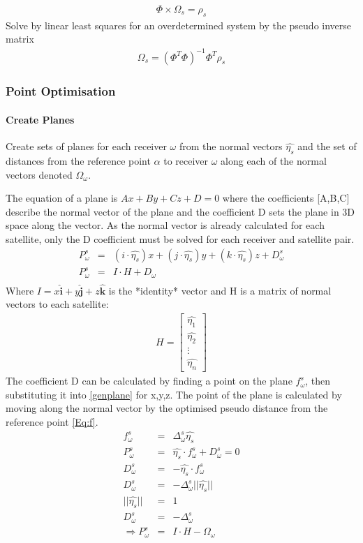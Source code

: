 \begin{eqnarray}
\Phi\times\Omega_s = \rho_s
\end{eqnarray}
Solve by linear least squares for an overdetermined system by the pseudo inverse matrix
\begin{eqnarray}
\Omega_s = (\Phi^T\Phi)^{-1}\Phi^T\rho_s
\end{eqnarray}

\subsubsection{Point Optimisation}
\paragraph{Create Planes}
Create sets of planes for each receiver $\omega$ from the normal vectors $\hat{\eta_s}$ and the set of distances from the reference point $\alpha$ to receiver $\omega$ along each of the normal vectors denoted $\Omega_\omega$.

The equation of a plane is $Ax+By+Cz+D=0$ where the coefficients [A,B,C] describe the normal vector of the plane and the coefficient D sets the plane in 3D space along the vector. As the normal vector is already calculated for each satellite, only the D coefficient must be solved for each receiver and satellite pair. 
\begin{eqnarray}
P_\omega^s &=& (i\cdot\hat{\eta_s})x + (j\cdot\hat{\eta_s})y + (k\cdot\hat{\eta_s})z + D_\omega^s \label{genplane}\\
P_\omega^s &=& I\cdot H +D_\omega\\
\end{eqnarray}
Where $I = x\hat{\textbf{i}}+y\hat{\textbf{j}}+z\hat{\textbf{k}}$ is the *identity* vector and H is a matrix of normal vectors to each satellite:
\begin{eqnarray}
H = \begin{bmatrix}
\hat{\eta_1} \\
\hat{\eta_2} \\
\vdots\\
\hat{\eta_n}
\end{bmatrix}
\end{eqnarray}
The coefficient D can be calculated by finding a point on the plane $f_\omega^s$, then substituting it into \eqref{genplane} for x,y,z. The point of the plane is calculated by moving along the normal vector by the optimised pseudo distance from the reference point \eqref{Eq:f}.
\begin{eqnarray}
f_\omega^s &=& \Delta_\omega^s\hat{\eta_s} \label{Eq:f}\\
P_\omega^s &=& \hat{\eta_s}\cdot f_\omega^s +D_\omega^s = 0\\
D_\omega^s &=& -\hat{\eta_s}\cdot f_\omega^s\\
D_\omega^s &=& -\Delta_\omega^s ||\hat{\eta_s}|| \\
||\hat{\eta_s}|| &=& 1\\
D_\omega^s &=& -\Delta_\omega^s\\
\Rightarrow P_\omega^s &=& I\cdot H -\Omega_\omega
\end{eqnarray}

